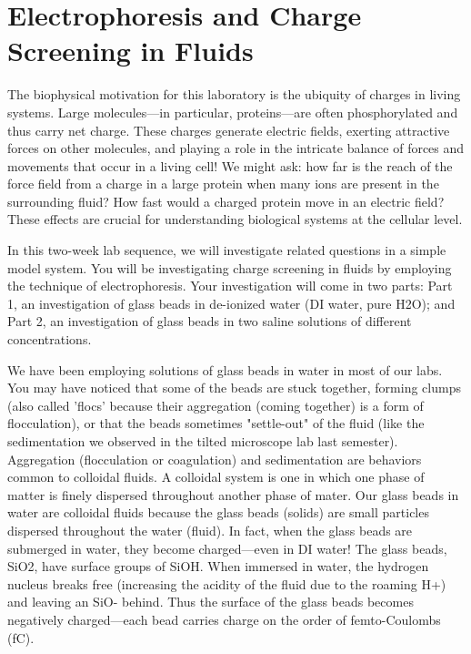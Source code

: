 \chapter{Electrophoresis and Charge Screening in Fluids}
\thispagestyle{fancy}
%
The biophysical motivation for this laboratory is the ubiquity of charges in living systems.
Large molecules—in particular, proteins—are often phosphorylated and thus carry net charge.
These charges generate electric fields, exerting attractive forces on other molecules, and playing a role in the intricate balance of forces and movements that occur in a living cell!
We might ask: how far is the reach of the force field from a charge in a large protein when many ions are present in the surrounding fluid?
How fast would a charged protein move in an electric field?
These effects are crucial for understanding biological systems at the cellular level.
\par 
In this two-week lab sequence, we will investigate related questions in a simple model system.
You will be investigating charge screening in fluids by employing the technique of electrophoresis.
Your investigation will come in two parts: Part 1, an investigation of glass beads in de-ionized water (DI water, pure H2O); and Part 2, an investigation of glass beads in two saline solutions of different concentrations.
\par 
We have been employing solutions of glass beads in water in most of our labs.
You may have noticed that some of the beads are stuck together, forming clumps (also called 'flocs' because their aggregation (coming together) is a form of flocculation), or that the beads sometimes "settle-out" of the fluid (like the sedimentation we observed in the tilted microscope lab last semester). 
Aggregation (flocculation or coagulation) and sedimentation are behaviors common to colloidal fluids. 
A colloidal system is one in which one phase of matter is finely dispersed throughout another phase of mater. 
Our glass beads in water are colloidal fluids because the glass beads (solids) are small particles dispersed throughout the water (fluid). 
In fact, when the glass beads are submerged in water, they become charged—even in DI water! 
The glass beads, SiO2, have surface groups of SiOH. 
When immersed in water, the hydrogen nucleus breaks free (increasing the acidity of the fluid due to the roaming H+) and leaving an SiO- behind. 
Thus the surface of the glass beads becomes negatively charged—each bead carries charge on the order of femto-Coulombs (fC). 
